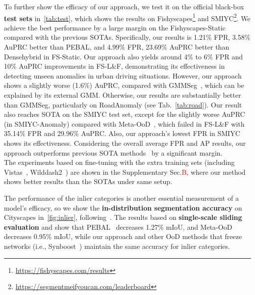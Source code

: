 \documentclass[10pt,twocolumn,letterpaper]{article}
\begin{document}
To further show the efficacy of our approach, we test it on the official black-box \textbf{test sets} in~\cref{tab:test}, which shows the results on Fishyscapes\protect\footnote{\url{https://fishyscapes.com/results}} and SMIYC\protect\footnote{\url{https://segmentmeifyoucan.com/leaderboard}}.  
We achieve the best performance by a large margin on the Fishyscapes-Static compared with the previous SOTAs. Specifically, our results is 1.21\% FPR, 3.58\% AuPRC better than PEBAL, and 4.99\% FPR, 23.69\% AuPRC better than Densehybrid in FS-Static. 
Our approach also yields around 4\% to 6\%  FPR and 10\% AuPRC improvements in FS-L\&F, demonstrating its effectiveness in detecting unseen anomalies in urban driving situations. 
However, our approach shows a slightly worse (1.6\%) AuPRC, compared with GMMSeg~\cite{liang2022gmmseg}, which can be explained by its external GMM. Otherwise, our results are substantially better than GMMSeg, particularly on RoadAnomaly (see Tab.~\ref{tab:road}). 
Our result also reaches SOTA on the SMIYC test set, except for the slightly worse AuPRC (in SMIYC-Anomaly) compared with Meta-OoD~\cite{chan2021entropy}, which failed in FS-L\&F with 35.14\% FPR and 29.96\% AuPRC. Also, our approach's lowest FPR in SMIYC shows its effectiveness. 
Considering the overall average FPR and AP results, our approach outperforms previous SOTA methods~\cite{tian2021pixel,chan2021entropy} by a significant margin. \\\indent The experiments based on fine-tuning with the extra training sets (including Vistas~\cite{neuhold2017mapillary}, Wilddash2~\cite{zendel2018wilddash}) are shown in the Supplementary Sec.\textcolor{red}{B}, where our method shows better results than the SOTAs under same setup.



The performance of the inlier categories is another essential measurement of a model's efficacy, so we show the \textbf{in-distribution segmentation accuracy} on Cityscapes in~\cref{fig:inlier}, following~\cite{jung2021standardized,di2021pixel,grcic2022densehybrid}. 
The results based on \textbf{single-scale sliding evaluation} and show that PEBAL~\cite{tian2021pixel} decreases 1.27\% mIoU, and Meta-OoD~\cite{chan2021entropy} decreases 0.95\% mIoU, while our approach and other 
OoD methods that freeze networks (i.e., Synboost~\cite{di2021pixel}) maintain the same accuracy for inlier categories.
\end{document}
